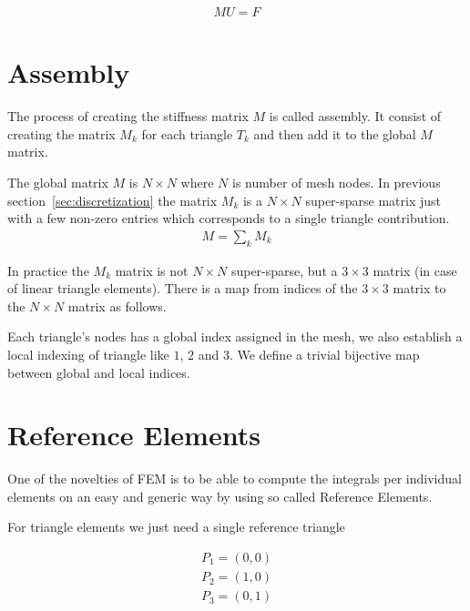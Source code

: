 \documentclass{birkjour}
\numberwithin{equation}{section}
\begin{document}
\begin{eqnarray} 
	M U = F
\end{eqnarray}

\section{Assembly}


The process of creating the stiffness matrix $M$ is called assembly. It consist of creating the matrix $M_k$ for each 
triangle $T_k$ and then add it to the global $M$ matrix. 
 
The global matrix $M$ is $N \times N$  where $N$ is number of mesh nodes. In previous section~\ref{sec:discretization}
the matrix $M_k$ is a $N \times N$ super-sparse matrix just with a few non-zero entries which corresponds to a single 
triangle contribution.
 \begin{eqnarray} 
	M = \sum_k M_k
\end{eqnarray}
 
In practice the $M_k$ matrix is not $N \times N$ super-sparse, but a $3 \times 3$ matrix (in case of linear triangle elements).
There is a map from indices of the $3 \times 3$ matrix to the $N \times N$ matrix as follows.
 
Each triangle's nodes has a global index assigned in the mesh, we also establish a local indexing of triangle
like $1$, $2$ and $3$. We define a trivial bijective map between global and local indices.

\section{Reference Elements}

One of the novelties of FEM is to be able to compute the integrals per individual elements on an easy and generic 
way by using so called Reference Elements.
 
For triangle elements we just need a single reference triangle
 
\begin{center}
\end{center}
\begin{eqnarray} 
	P_1 = (0,0) \nonumber\\
	P_2 = (1,0) \nonumber\\
	P_3 = (0,1) \nonumber
\end{eqnarray}
\end{document}
